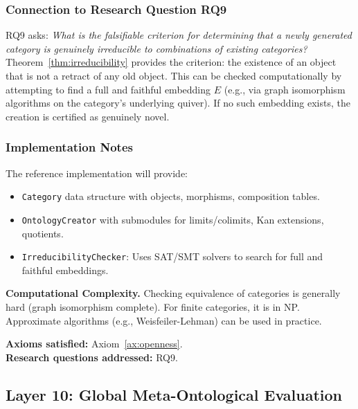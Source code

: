 \subsubsection{Connection to Research Question RQ9}
RQ9 asks: \emph{What is the falsifiable criterion for determining that a newly generated category is genuinely irreducible to combinations of existing categories?} Theorem~\ref{thm:irreducibility} provides the criterion: the existence of an object that is not a retract of any old object. This can be checked computationally by attempting to find a full and faithful embedding $E$ (e.g., via graph isomorphism algorithms on the category's underlying quiver). If no such embedding exists, the creation is certified as genuinely novel.

\subsubsection{Implementation Notes}
The reference implementation will provide:
\begin{itemize}
    \item \texttt{Category} data structure with objects, morphisms, composition tables.
    \item \texttt{OntologyCreator} with submodules for limits/colimits, Kan extensions, quotients.
    \item \texttt{IrreducibilityChecker}: Uses SAT/SMT solvers to search for full and faithful embeddings.
\end{itemize}

\textbf{Computational Complexity.} Checking equivalence of categories is generally hard (graph isomorphism complete). For finite categories, it is in NP. Approximate algorithms (e.g., Weisfeiler-Lehman) can be used in practice.

\textbf{Axioms satisfied:} Axiom~\ref{ax:openness}. \\
\textbf{Research questions addressed:} RQ9.

\subsection{Layer 10: Global Meta-Ontological Evaluation}
\label{subsec:layer10}

